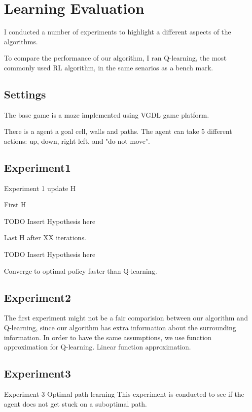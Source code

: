 \section{Learning Evaluation}
\label{learning_evaluation}

I conducted a number of experiments to highlight a different aspects of the algorithms. 

To compare the performance of our algorithm, I ran Q-learning, the most commonly used RL algorithm, in the same senarios as a bench mark. 

\subsection{Settings}
The base game is a maze implemented using VGDL game platform. 

There is a agent a goal cell, walls and paths. The agent can take 5 different actions: up, down, right left, and "do not move".  

\subsection{Experiment1}

Experiment 1 update H

First H

TODO Insert Hypothesis here

Last H after XX iterations. 

TODO Insert Hypothesis here


Converge to optimal policy faster than Q-learning.

\subsection{Experiment2}

The first experiment might not be a fair comparision between our algorithm and Q-learning, since our algorithm has extra information about the surrounding information.
In order to have the same assumptions, we use function approximation for Q-learning. 
Linear function approximation. 

\subsection{Experiment3}
Experiment 3 Optimal path learning
This experiment is conducted to see if the agent does not get stuck on a suboptimal path. 

